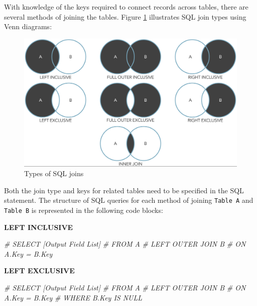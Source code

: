 \documentclass[
]{book}
\newenvironment{Shaded}{\begin{snugshade}}{\end{snugshade}}
\newcommand{\CommentTok}[1]{\textcolor[rgb]{0.56,0.35,0.01}{\textit{#1}}}
\begin{document}
With knowledge of the keys required to connect records across tables, there are several methods of joining the tables. Figure \ref{fig:sql-joins} illustrates SQL join types using Venn diagrams:

\begin{figure}

{\centering \includegraphics[width=1\linewidth]{graphics/sql_joins} 

}

\caption{Types of SQL joins}\label{fig:sql-joins}
\end{figure}

Both the join type and keys for related tables need to be specified in the SQL statement. The structure of SQL queries for each method of joining \texttt{Table\ A} and \texttt{Table\ B} is represented in the following code blocks:

\textbf{LEFT INCLUSIVE}

\begin{Shaded}
\begin{Highlighting}[]
\CommentTok{\#  SELECT [Output Field List]}
\CommentTok{\#  FROM A }
\CommentTok{\#  LEFT OUTER JOIN B}
\CommentTok{\#  ON A.Key = B.Key}
\end{Highlighting}
\end{Shaded}

\textbf{LEFT EXCLUSIVE}

\begin{Shaded}
\begin{Highlighting}[]
\CommentTok{\#  SELECT [Output Field List]}
\CommentTok{\#  FROM A }
\CommentTok{\#  LEFT OUTER JOIN B}
\CommentTok{\#  ON A.Key = B.Key}
\CommentTok{\#  WHERE B.Key IS NULL}
\end{Highlighting}
\end{Shaded}
\end{document}
